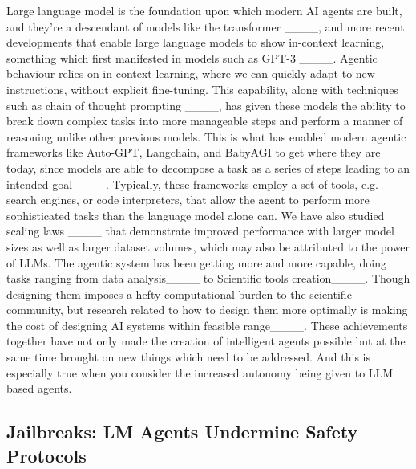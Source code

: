 Large language model is the foundation upon which modern AI agents are built, and they're a descendant of models like the transformer ____, and more recent developments that enable large language models to show in-context learning, something which first manifested in models such as GPT-3 ____. Agentic behaviour relies on in-context learning, where we can quickly adapt to new instructions, without explicit fine-tuning. This capability, along with techniques such as chain of thought prompting ____, has given these models the ability to break down complex tasks into more manageable steps and perform a manner of reasoning unlike other previous models. This is what has enabled modern agentic frameworks like Auto-GPT, Langchain, and BabyAGI to get where they are today, since models are able to decompose a task as a series of steps leading to an intended goal____. Typically, these frameworks employ a set of tools, e.g. search engines, or code interpreters, that allow the agent to perform more sophisticated tasks than the language model alone can. We have also studied scaling laws ____ that demonstrate improved performance with larger model sizes as well as larger dataset volumes, which may also be attributed to the power of LLMs. The agentic system has been getting more and more capable, doing tasks ranging from data analysis____ to Scientific tools creation____. Though designing them imposes a hefty computational burden to the scientific community, but research related to how to design them more optimally is making the cost of designing AI systems within feasible range____.  These achievements together have not only made the creation of intelligent agents possible but at the same time brought on new things which need to be addressed. And this is especially true when you consider the increased autonomy being given to LLM based agents.



\subsection{Jailbreaks: LM Agents Undermine Safety Protocols}

